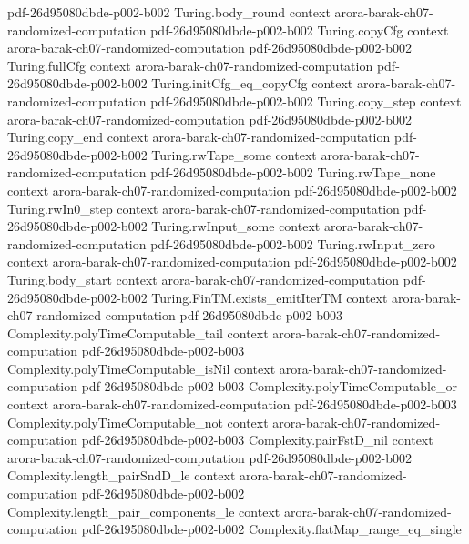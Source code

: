 \begin{theorem}
  {pdf-26d95080dbde-p002-b002}
\proofstep
  {Turing.body_round}
  {context}
  {arora-barak-ch07-randomized-computation}
  {pdf-26d95080dbde-p002-b002}
\proofstep
  {Turing.copyCfg}
  {context}
  {arora-barak-ch07-randomized-computation}
  {pdf-26d95080dbde-p002-b002}
\proofstep
  {Turing.fullCfg}
  {context}
  {arora-barak-ch07-randomized-computation}
  {pdf-26d95080dbde-p002-b002}
\proofstep
  {Turing.initCfg_eq_copyCfg}
  {context}
  {arora-barak-ch07-randomized-computation}
  {pdf-26d95080dbde-p002-b002}
\proofstep
  {Turing.copy_step}
  {context}
  {arora-barak-ch07-randomized-computation}
  {pdf-26d95080dbde-p002-b002}
\proofstep
  {Turing.copy_end}
  {context}
  {arora-barak-ch07-randomized-computation}
  {pdf-26d95080dbde-p002-b002}
\proofstep
  {Turing.rwTape_some}
  {context}
  {arora-barak-ch07-randomized-computation}
  {pdf-26d95080dbde-p002-b002}
\proofstep
  {Turing.rwTape_none}
  {context}
  {arora-barak-ch07-randomized-computation}
  {pdf-26d95080dbde-p002-b002}
\proofstep
  {Turing.rwIn0_step}
  {context}
  {arora-barak-ch07-randomized-computation}
  {pdf-26d95080dbde-p002-b002}
\proofstep
  {Turing.rwInput_some}
  {context}
  {arora-barak-ch07-randomized-computation}
  {pdf-26d95080dbde-p002-b002}
\proofstep
  {Turing.rwInput_zero}
  {context}
  {arora-barak-ch07-randomized-computation}
  {pdf-26d95080dbde-p002-b002}
\proofstep
  {Turing.body_start}
  {context}
  {arora-barak-ch07-randomized-computation}
  {pdf-26d95080dbde-p002-b002}
\proofstep
  {Turing.FinTM.exists_emitIterTM}
  {context}
  {arora-barak-ch07-randomized-computation}
  {pdf-26d95080dbde-p002-b003}
\proofstep
  {Complexity.polyTimeComputable_tail}
  {context}
  {arora-barak-ch07-randomized-computation}
  {pdf-26d95080dbde-p002-b003}
\proofstep
  {Complexity.polyTimeComputable_isNil}
  {context}
  {arora-barak-ch07-randomized-computation}
  {pdf-26d95080dbde-p002-b003}
\proofstep
  {Complexity.polyTimeComputable_or}
  {context}
  {arora-barak-ch07-randomized-computation}
  {pdf-26d95080dbde-p002-b003}
\proofstep
  {Complexity.polyTimeComputable_not}
  {context}
  {arora-barak-ch07-randomized-computation}
  {pdf-26d95080dbde-p002-b003}
\proofstep
  {Complexity.pairFstD_nil}
  {context}
  {arora-barak-ch07-randomized-computation}
  {pdf-26d95080dbde-p002-b002}
\proofstep
  {Complexity.length_pairSndD_le}
  {context}
  {arora-barak-ch07-randomized-computation}
  {pdf-26d95080dbde-p002-b002}
\proofstep
  {Complexity.length_pair_components_le}
  {context}
  {arora-barak-ch07-randomized-computation}
  {pdf-26d95080dbde-p002-b002}
\proofstep
  {Complexity.flatMap_range_eq_single}

\end{theorem}
